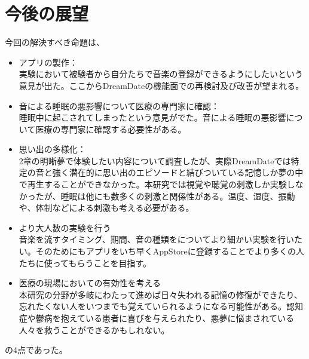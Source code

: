 \section{今後の展望}
今回の解決すべき命題は、
\begin{itemize}
\item アプリの製作：\\
実験において被験者から自分たちで音楽の登録ができるようにしたいという意見が出た。ここからDreamDateの機能面での再検討及び改善が望まれる。

\item 音による睡眠の悪影響について医療の専門家に確認：\\
睡眠中に起こされてしまったという意見がでた。音による睡眠の悪影響について医療の専門家に確認する必要性がある。

\item 思い出の多様化：\\
2章の明晰夢で体験したい内容について調査したが、実際DreamDateでは特定の音と強く潜在的に思い出のエピソードと結びついている記憶しか夢の中で再生することができなかった。本研究では視覚や聴覚の刺激しか実験しなかったが、睡眠は他にも数多くの刺激と関係性がある。温度、湿度、振動や、体制などによる刺激も考える必要がある。

\item より大人数の実験を行う\\
音楽を流すタイミング、期間、音の種類をについてより細かい実験を行いたい。そのためにもアプリをいち早くAppStoreに登録することでより多くの人たちに使ってもらうことを目指す。

\item 医療の現場においての有効性を考える\\
本研究の分野が多岐にわたって進めば日々失われる記憶の修復ができたり、忘れたくない人をいつまでも覚えていられるようになる可能性がある。認知症や鬱病を抱えている患者に喜びを与えられたり、悪夢に悩まされている人々を救うことができるかもしれない。

\end{itemize}

の4点であった。